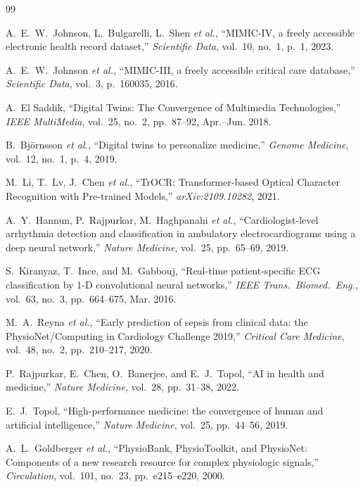 \documentclass[12pt,a4paper]{article}
\begin{document}
\begin{thebibliography}{99}

A.~E.~W.~Johnson, L.~Bulgarelli, L.~Shen \textit{et al.}, ``MIMIC-IV, a freely accessible electronic health record dataset,'' \textit{Scientific Data}, vol.~10, no.~1, p.~1, 2023.

A.~E.~W.~Johnson \textit{et al.}, ``MIMIC-III, a freely accessible critical care database,'' \textit{Scientific Data}, vol.~3, p.~160035, 2016.

A.~El Saddik, ``Digital Twins: The Convergence of Multimedia Technologies,'' \textit{IEEE MultiMedia}, vol.~25, no.~2, pp.~87--92, Apr.--Jun. 2018.

B.~Björnsson \textit{et al.}, ``Digital twins to personalize medicine,'' \textit{Genome Medicine}, vol.~12, no.~1, p.~4, 2019.

M.~Li, T.~Lv, J.~Chen \textit{et al.}, ``TrOCR: Transformer-based Optical Character Recognition with Pre-trained Models,'' \textit{arXiv:2109.10282}, 2021.

A.~Y.~Hannun, P.~Rajpurkar, M.~Haghpanahi \textit{et al.}, ``Cardiologist-level arrhythmia detection and classification in ambulatory electrocardiograms using a deep neural network,'' \textit{Nature Medicine}, vol.~25, pp.~65--69, 2019.

S.~Kiranyaz, T.~Ince, and M.~Gabbouj, ``Real-time patient-specific ECG classification by 1-D convolutional neural networks,'' \textit{IEEE Trans.\ Biomed.\ Eng.}, vol.~63, no.~3, pp.~664--675, Mar. 2016.

M.~A.~Reyna \textit{et al.}, ``Early prediction of sepsis from clinical data: the PhysioNet/Computing in Cardiology Challenge 2019,'' \textit{Critical Care Medicine}, vol.~48, no.~2, pp.~210--217, 2020.

P.~Rajpurkar, E.~Chen, O.~Banerjee, and E.~J.~Topol, ``AI in health and medicine,'' \textit{Nature Medicine}, vol.~28, pp.~31--38, 2022.

E.~J.~Topol, ``High-performance medicine: the convergence of human and artificial intelligence,'' \textit{Nature Medicine}, vol.~25, pp.~44--56, 2019.

A.~L.~Goldberger \textit{et al.}, ``PhysioBank, PhysioToolkit, and PhysioNet: Components of a new research resource for complex physiologic signals,'' \textit{Circulation}, vol.~101, no.~23, pp.~e215--e220, 2000.


\end{thebibliography}
\end{document}
